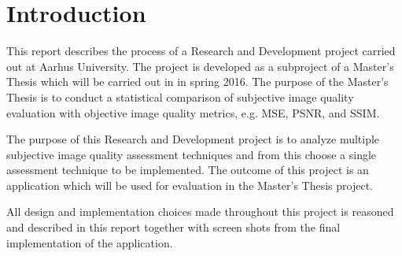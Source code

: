 \graphicspath{{Chapters/Introduction/}}

\chapter{Introduction}
This report describes the process of a Research and Development project carried out at Aarhus University. The project is developed as a subproject of a Master's Thesis which will be carried out in in spring 2016. The purpose of the Master's Thesis is to conduct a statistical comparison of subjective image quality evaluation with objective image quality metrics, e.g. MSE, PSNR, and SSIM.

The purpose of this Research and Development project is to analyze multiple subjective image quality assessment techniques and from this choose a single assessment technique to be implemented. The outcome of this project is an application which will be used for evaluation in the Master's Thesis project.

All design and implementation choices made throughout this project is reasoned and described in this report together with screen shots from the final implementation of the application.